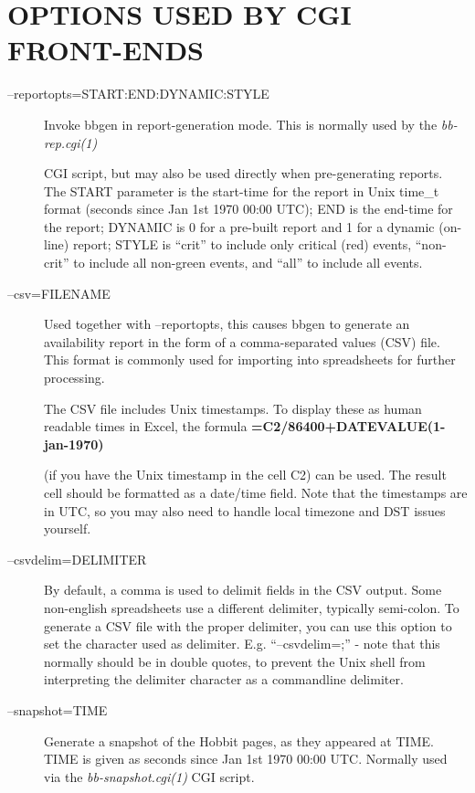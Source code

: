 \section{OPTIONS USED BY CGI FRONT-ENDS}
\begin{description}
\item[--reportopts=START:END:DYNAMIC:STYLE] Invoke bbgen in
  report-generation mode. This is normally used by the
  \emph{bb-rep.cgi(1)}

 CGI script, but may also be used directly when pre-generating
 reports. The START parameter is the start-time for the report in Unix
 time\_t format (seconds since Jan 1st 1970 00:00 UTC); END is the
 end-time for the report; DYNAMIC is 0 for a pre-built report and 1
 for a dynamic (on-line) report; STYLE is ``crit'' to include only
 critical (red) events, ``non-crit'' to include all non-green events,
 and ``all'' to include all events. 


 

\item[--csv=FILENAME] Used together with --reportopts, this causes
  bbgen to generate an availability report in the form of a
  comma-separated values (CSV) file. This format is commonly used for
  importing into spreadsheets for further processing.  

 The CSV file includes Unix timestamps. To display these as human
 readable times in Excel, the formula
 \textbf{=C2/86400+DATEVALUE(1-jan-1970)}

 (if you have the Unix timestamp in the cell C2) can be used. The
 result cell should be formatted as a date/time field. Note that the
 timestamps are in UTC, so you may also need to handle local timezone
 and DST issues yourself. 


 

\item[--csvdelim=DELIMITER] By default, a comma is used to delimit
  fields in the CSV output. Some non-english spreadsheets use a
  different delimiter, typically semi-colon. To generate a CSV file
  with the proper delimiter, you can use this option to set the
  character used as delimiter. E.g. ``--csvdelim=;'' - note that this
  normally should be in double quotes, to prevent the Unix shell from
  interpreting the delimiter character as a commandline delimiter. 



\item[--snapshot=TIME] Generate a snapshot of the Hobbit pages, as
  they appeared at TIME. TIME is given as seconds since Jan 1st 1970
  00:00 UTC. Normally used via the \emph{bb-snapshot.cgi(1)} CGI script. 

 


\end{description}
